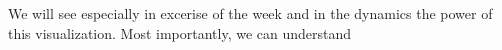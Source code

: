 We will see especially in excerise of the week and in the dynamics the power of this visualization. Most importantly, we can understand 